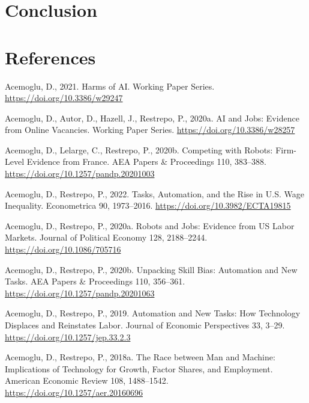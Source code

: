 \documentclass[
  11,
  a4paperpaper,
]{article}
\newlength{\cslhangindent}
\newenvironment{CSLReferences}[2] %
 {\begin{list}{}{%
  \setlength{\itemindent}{0pt}
  \setlength{\leftmargin}{0pt}
  \setlength{\parsep}{0pt}
  \ifodd #1
   \setlength{\leftmargin}{\cslhangindent}
   \setlength{\itemindent}{-1\cslhangindent}
  \fi
  \setlength{\itemsep}{#2\baselineskip}}}
 {\end{list}}
\let\oldsection\section
\renewcommand\section{\clearpage\oldsection}
\begin{document}
\section{Conclusion}\label{conclusion}

\newpage{}

\section*{References}\label{sec-references}

\label{refs}
\begin{CSLReferences}{1}{0}
Acemoglu, D., 2021. Harms of {AI}. Working {Paper} {Series}.
\url{https://doi.org/10.3386/w29247}

Acemoglu, D., Autor, D., Hazell, J., Restrepo, P., 2020a. {AI} and
{Jobs}: {Evidence} from {Online} {Vacancies}. Working {Paper} {Series}.
\url{https://doi.org/10.3386/w28257}

Acemoglu, D., Lelarge, C., Restrepo, P., 2020b. Competing with {Robots}:
{Firm}-{Level} {Evidence} from {France}. AEA Papers \& Proceedings 110,
383--388. \url{https://doi.org/10.1257/pandp.20201003}

Acemoglu, D., Restrepo, P., 2022. Tasks, {Automation}, and the {Rise} in
{U}.{S}. {Wage} {Inequality}. Econometrica 90, 1973--2016.
\url{https://doi.org/10.3982/ECTA19815}

Acemoglu, D., Restrepo, P., 2020a. Robots and {Jobs}: {Evidence} from
{US} {Labor} {Markets}. Journal of Political Economy 128, 2188--2244.
\url{https://doi.org/10.1086/705716}

Acemoglu, D., Restrepo, P., 2020b. Unpacking {Skill} {Bias}:
{Automation} and {New} {Tasks}. AEA Papers \& Proceedings 110, 356--361.
\url{https://doi.org/10.1257/pandp.20201063}

Acemoglu, D., Restrepo, P., 2019. Automation and {New} {Tasks}: {How}
{Technology} {Displaces} and {Reinstates} {Labor}. Journal of Economic
Perspectives 33, 3--29. \url{https://doi.org/10.1257/jep.33.2.3}

Acemoglu, D., Restrepo, P., 2018a. The {Race} between {Man} and
{Machine}: {Implications} of {Technology} for {Growth}, {Factor}
{Shares}, and {Employment}. American Economic Review 108, 1488--1542.
\url{https://doi.org/10.1257/aer.20160696}


\end{CSLReferences}
\end{document}
